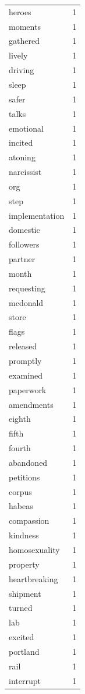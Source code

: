 \begin{tabular}{lr}
heroes & 1 \\
moments & 1 \\
gathered & 1 \\
lively & 1 \\
driving & 1 \\
sleep & 1 \\
safer & 1 \\
talks & 1 \\
emotional & 1 \\
incited & 1 \\
atoning & 1 \\
narcissist & 1 \\
org & 1 \\
step & 1 \\
implementation & 1 \\
domestic & 1 \\
followers & 1 \\
partner & 1 \\
month & 1 \\
requesting & 1 \\
mcdonald & 1 \\
store & 1 \\
flags & 1 \\
released & 1 \\
promptly & 1 \\
examined & 1 \\
paperwork & 1 \\
amendments & 1 \\
eighth & 1 \\
fifth & 1 \\
fourth & 1 \\
abandoned & 1 \\
petitions & 1 \\
corpus & 1 \\
habeas & 1 \\
compassion & 1 \\
kindness & 1 \\
homosexuality & 1 \\
property & 1 \\
heartbreaking & 1 \\
shipment & 1 \\
turned & 1 \\
lab & 1 \\
excited & 1 \\
portland & 1 \\
rail & 1 \\
interrupt & 1 \\

\end{tabular}
